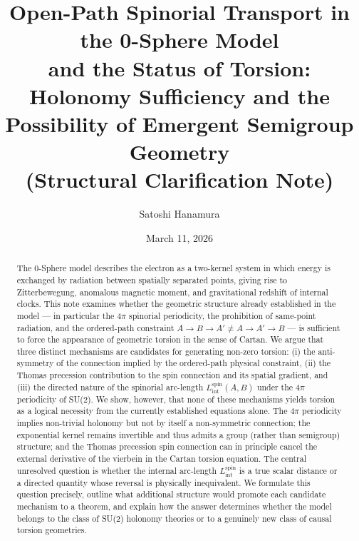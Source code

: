 \documentclass[%
 reprint,
 amsmath,amssymb,
 aps,
 prb,
]{revtex4-2}
\numberwithin{equation}{section}
\newcommand{\Lspin}{L_{\text{int}}^{\text{spin}}}
\begin{document}
\title{Open-Path Spinorial Transport in the 0-Sphere Model\\ and the Status of Torsion:\\ Holonomy Sufficiency and the Possibility of Emergent Semigroup Geometry\\
{\normalsize (Structural Clarification Note)}}

\author{Satoshi Hanamura}
\date{March 11, 2026}

\begin{abstract}
The 0-Sphere model describes the electron as a two-kernel system in which energy is exchanged by radiation between spatially separated points, giving rise to Zitterbewegung, anomalous magnetic moment, and gravitational redshift of internal clocks. This note examines whether the geometric structure already established in the model --- in particular the $4\pi$ spinorial periodicity, the prohibition of same-point radiation, and the ordered-path constraint $A\to B\to A' \neq A\to A'\to B$ --- is sufficient to force the appearance of geometric torsion in the sense of Cartan. We argue that three distinct mechanisms are candidates for generating non-zero torsion: (i) the anti-symmetry of the connection implied by the ordered-path physical constraint, (ii) the Thomas precession contribution to the spin connection and its spatial gradient, and (iii) the directed nature of the spinorial arc-length $\Lspin(A,B)$ under the $4\pi$ periodicity of SU(2). We show, however, that none of these mechanisms yields torsion as a logical necessity from the currently established equations alone. The $4\pi$ periodicity implies non-trivial holonomy but not by itself a non-symmetric connection; the exponential kernel remains invertible and thus admits a group (rather than semigroup) structure; and the Thomas precession spin connection can in principle cancel the external derivative of the vierbein in the Cartan torsion equation. The central unresolved question is whether the internal arc-length $\Lspin$ is a true scalar distance or a directed quantity whose reversal is physically inequivalent. We formulate this question precisely, outline what additional structure would promote each candidate mechanism to a theorem, and explain how the answer determines whether the model belongs to the class of SU(2) holonomy theories or to a genuinely new class of causal torsion geometries.
\end{abstract}

\maketitle
\end{document}
